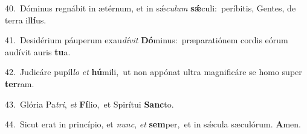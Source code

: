 {\numbfont\textcolor{\numbcolor}{40.}}~Dóminus regnábit in ætérnum, et in sǽ\-\textit{cu}\-\textit{lum} \textbf{sǽ}\-culi:~\star períbitis, Gentes, de terra il\-\textbf{lí}\-us.\par
{\numbfont\textcolor{\numbcolor}{41.}}~Desidérium páuperum exau\-\textit{dí}\-\textit{vit} \textbf{Dó}\-minus:~\star præparatiónem cordis eórum audívit auris \textbf{tu}\-a.\par
{\numbfont\textcolor{\numbcolor}{42.}}~Judicáre pupíl\textit{lo} \textit{et} \textbf{hú}\-mili,~\star ut non appónat ultra magnificáre se homo super \textbf{ter}\-ram.\par
{\numbfont\textcolor{\numbcolor}{43.}}~Glória Pa\-\textit{tri}\-, \textit{et} \textbf{Fí}\-lio,~\star et Spirítui \textbf{Sanc}\-to.\par
{\numbfont\textcolor{\numbcolor}{44.}}~Sicut erat in princípio, et \textit{nunc}\-, \textit{et} \textbf{sem}\-per,~\star et in sǽcula sæculórum. \textbf{A}\-men.\par
